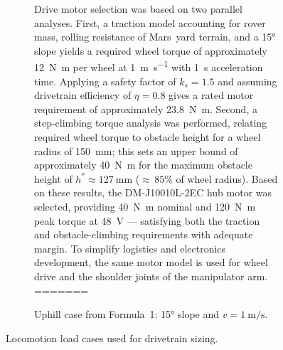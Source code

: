 \begin{figure}[H]
\begin{minipage}{0.78\textwidth}
\begin{subfigure}[t]{0.49\linewidth}
Drive motor selection was based on two parallel analyses.
First, a traction model accounting for rover mass, rolling
resistance of Mars~yard terrain, and a \ang{15} slope yields
a required wheel torque of approximately \SI{12}{\newton\metre}
per wheel at \SI{1}{\metre\per\second} with \SI{1}{\second}
acceleration time. Applying a safety factor of $k_s = 1.5$ and
assuming drivetrain efficiency of $\eta = 0.8$ gives a rated
motor requirement of approximately \SI{23.8}{\newton\metre}.
Second, a step-climbing torque analysis was performed, relating
required wheel torque to obstacle height for a wheel radius of
\SI{150}{\milli\metre}; this sets an upper bound of approximately
\SI{40}{\newton\metre} for the maximum obstacle height of
$h^* \approx \SI{127}{\milli\metre}$ (${\approx}\,85\%$ of wheel
radius). Based on these results, the \mbox{DM-J10010L-2EC} hub
motor was selected, providing \SI{40}{\newton\metre} nominal and
\SI{120}{\newton\metre} peak torque at \SI{48}{\volt} ---
satisfying both the traction and obstacle-climbing requirements
with adequate margin. To simplify logistics and electronics
development, the same motor model is used for wheel drive and the shoulder joints of the
manipulator arm.
=======
\end{subfigure}\hfill
\begin{subfigure}[t]{0.49\linewidth}
\centering
{}
\caption{Uphill case from Formula~1: \ang{15} slope and $v=\SI{1}{\metre\per\second}$.}
\label{fig:uphill_motion_formula1}
\end{subfigure}
\end{minipage}

\caption{Locomotion load cases used for drivetrain sizing.}
\label{fig:locomotion_load_cases}
\end{figure}

